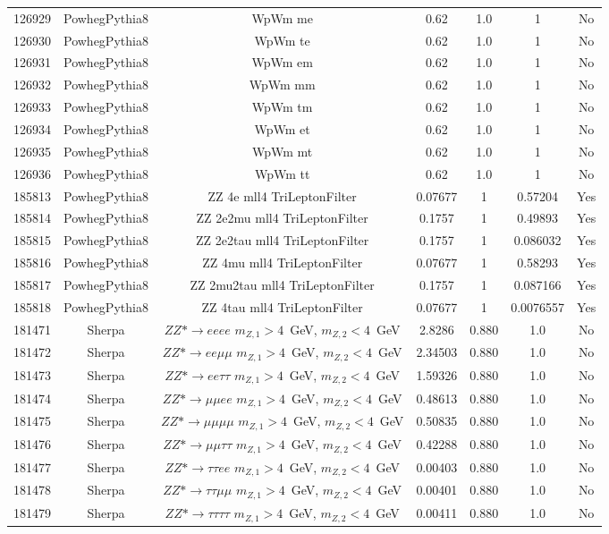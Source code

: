 \begin{table}[ht!]
\begin{footnotesize}
\begin{tabular}{c|c|c|c|c|c|c}
126929 & PowhegPythia8& WpWm me  &  0.62  &  1.0  &  1 & No  \\
126930 & PowhegPythia8& WpWm te  &  0.62  &  1.0  &  1 & No  \\
126931 & PowhegPythia8& WpWm em  &  0.62  &  1.0  &  1 & No \\
126932 & PowhegPythia8& WpWm mm  &  0.62  &  1.0  &  1 & No \\
126933 & PowhegPythia8& WpWm tm  &  0.62  &  1.0  &  1 & No \\
126934 & PowhegPythia8& WpWm et  &  0.62  &  1.0  &  1 & No \\
126935 & PowhegPythia8& WpWm mt  &  0.62  &  1.0  &  1 & No \\
126936 & PowhegPythia8& WpWm tt  &  0.62  &  1.0  &  1 & No \\

185813 & PowhegPythia8& ZZ 4e mll4 TriLeptonFilter & 0.07677 & 1 & 0.57204 & Yes \\
185814 & PowhegPythia8& ZZ 2e2mu mll4 TriLeptonFilter & 0.1757 & 1 & 0.49893 & Yes \\
185815 & PowhegPythia8& ZZ 2e2tau mll4 TriLeptonFilter & 0.1757 & 1 & 0.086032 & Yes \\
185816 & PowhegPythia8& ZZ 4mu mll4 TriLeptonFilter & 0.07677 & 1 & 0.58293 & Yes \\
185817 & PowhegPythia8& ZZ 2mu2tau mll4 TriLeptonFilter & 0.1757 & 1 & 0.087166 & Yes \\
185818 & PowhegPythia8& ZZ 4tau mll4 TriLeptonFilter & 0.07677 & 1 & 0.0076557 & Yes \\

181471 & Sherpa & $ZZ*\rightarrow eeee$  $m_{Z,1} > 4$~GeV, $m_{Z,2} < 4$~GeV  & 2.8286 & 0.880 & 1.0 & No \\
181472 & Sherpa & $ZZ*\rightarrow ee\mu\mu$ $m_{Z,1} > 4$~GeV, $m_{Z,2} < 4$~GeV  & 2.34503 & 0.880 & 1.0 & No \\
181473 & Sherpa & $ZZ*\rightarrow ee\tau\tau$ $m_{Z,1} > 4$~GeV, $m_{Z,2} < 4$~GeV  & 1.59326 & 0.880 & 1.0 & No \\
181474 & Sherpa & $ZZ*\rightarrow \mu\mu ee$ $m_{Z,1} > 4$~GeV, $m_{Z,2} < 4$~GeV  & 0.48613 & 0.880 & 1.0 & No \\
181475 & Sherpa & $ZZ*\rightarrow \mu\mu\mu\mu$ $m_{Z,1} > 4$~GeV, $m_{Z,2} < 4$~GeV  & 0.50835 & 0.880 & 1.0 & No \\
181476 & Sherpa & $ZZ*\rightarrow \mu\mu\tau\tau$ $m_{Z,1} > 4$~GeV, $m_{Z,2} < 4$~GeV  & 0.42288 & 0.880 & 1.0 & No \\
181477 & Sherpa & $ZZ*\rightarrow \tau\tau ee$ $m_{Z,1} > 4$~GeV, $m_{Z,2} < 4$~GeV  & 0.00403 & 0.880 & 1.0 & No \\
181478 & Sherpa & $ZZ*\rightarrow \tau\tau\mu\mu$ $m_{Z,1} > 4$~GeV, $m_{Z,2} < 4$~GeV  & 0.00401 & 0.880 & 1.0 & No \\
181479 & Sherpa & $ZZ*\rightarrow \tau\tau\tau\tau$ $m_{Z,1} > 4$~GeV, $m_{Z,2} < 4$~GeV  & 0.00411 & 0.880 & 1.0 & No \\



\end{tabular}
\end{footnotesize}
\end{table}
